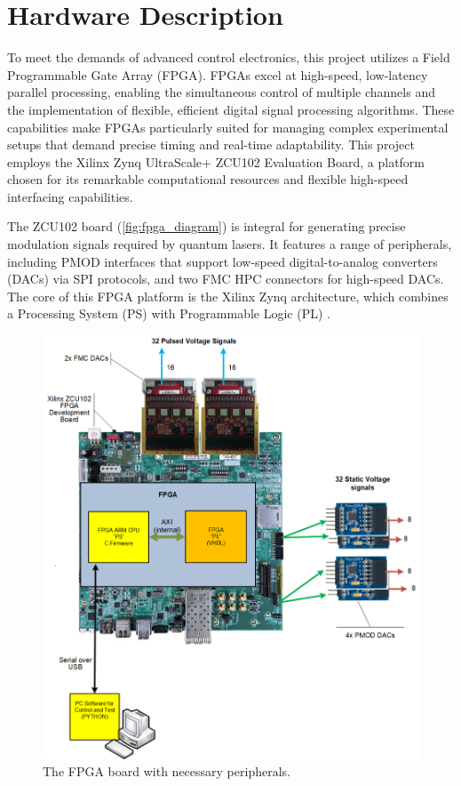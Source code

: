 \section{Hardware Description}\label{sec:bg_hw}
To meet the demands of advanced control electronics, this project utilizes a Field Programmable Gate Array (FPGA). FPGAs excel at high-speed, low-latency parallel processing, enabling the simultaneous control of multiple channels and the implementation of flexible, efficient digital signal processing algorithms. These capabilities make FPGAs particularly suited for managing complex experimental setups that demand precise timing and real-time adaptability. This project employs the Xilinx Zynq UltraScale+ ZCU102 Evaluation Board, a platform chosen for its remarkable computational resources and flexible high-speed interfacing capabilities.

The ZCU102 board (\autoref{fig:fpga_diagram}) is integral for generating precise modulation signals required by quantum lasers. It features a range of peripherals, including PMOD interfaces that support low-speed digital-to-analog converters (DACs) via SPI protocols, and two FMC HPC connectors for high-speed DACs. The core of this FPGA platform is the Xilinx Zynq architecture, which combines a Processing System (PS) with Programmable Logic (PL) \cite{XilinxUG1182}.

\begin{figure}[ht]
    \centering
    \includegraphics[width=0.80\linewidth]{figures/board.png}
    \caption{The FPGA board with necessary peripherals.}
    \label{fig:fpga_diagram}
\end{figure}

